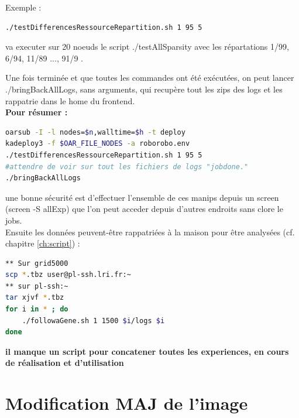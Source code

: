 \documentclass[a4paper,10pt]{report}
\begin{document}
Exemple :
\begin{lstlisting}[language=bash]
./testDifferencesRessourceRepartition.sh 1 95 5 
\end{lstlisting}
va executer sur 20 noeuds le script ./testAllSparsity avec les répartations 1/99, 6/94, 11/89 ..., 91/9 . 


Une fois terminée et que toutes les commandes ont été exécutées, on peut lancer ./bringBackAllLogs, sans arguments, qui recupère tout les zips des logs et les rappatrie dans le home du frontend.\\


\textbf{Pour résumer :}

\begin{lstlisting}[language=bash]
oarsub -I -l nodes=$n,walltime=$h -t deploy
kadeploy3 -f $OAR_FILE_NODES -a roborobo.env
./testDifferencesRessourceRepartition.sh 1 95 5 
#attendre de voir sur tout les fichiers de logs "jobdone."
./bringBackAllLogs
\end{lstlisting}
une bonne sécurité est d'effectuer l'ensemble de ces manips depuis un screen (screen -S allExp) que l'on peut acceder depuis d'autres endroits sans clore le jobs.\\

Ensuite les données peuvent-être rappatriées à la maison pour être analysées (cf. chapitre \ref{ch:script}) :
\begin{lstlisting}[language=bash]
** Sur grid5000
scp *.tbz user@pl-ssh.lri.fr:~
** sur pl-ssh:~
tar xjvf *.tbz
for i in * ; do
	./followaGene.sh 1 1500 $i/logs $i
done

\end{lstlisting}

\textbf{il manque un script pour concatener toutes les experiences, en cours de réalisation et d'utilisation}

\section{Modification MAJ de l'image}
\label{sec:maj}
\end{document}
